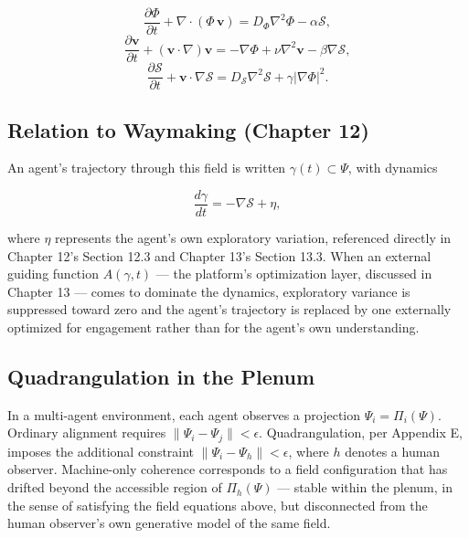 \documentclass[12pt,a4paper]{book}
\begin{document}
\[
\frac{\partial \Phi}{\partial t} + \nabla \cdot (\Phi\, \mathbf{v}) = D_\Phi \nabla^2 \Phi - \alpha \mathcal{S},
\]
\[
\frac{\partial \mathbf{v}}{\partial t} + (\mathbf{v} \cdot \nabla)\mathbf{v} = -\nabla \Phi + \nu \nabla^2 \mathbf{v} - \beta \nabla \mathcal{S},
\]
\[
\frac{\partial \mathcal{S}}{\partial t} + \mathbf{v} \cdot \nabla \mathcal{S} = D_\mathcal{S} \nabla^2 \mathcal{S} + \gamma |\nabla \Phi|^2.
\]

\subsection*{Relation to Waymaking (Chapter 12)}

An agent's trajectory through this field is written $\gamma(t) \subset \Psi$, with dynamics

\[
\frac{d\gamma}{dt} = -\nabla \mathcal{S} + \eta,
\]

where $\eta$ represents the agent's own exploratory variation, referenced directly in Chapter 12's Section 12.3 and Chapter 13's Section 13.3. When an external guiding function $A(\gamma, t)$ — the platform's optimization layer, discussed in Chapter 13 — comes to dominate the dynamics, exploratory variance is suppressed toward zero and the agent's trajectory is replaced by one externally optimized for engagement rather than for the agent's own understanding.

\subsection*{Quadrangulation in the Plenum}

In a multi-agent environment, each agent observes a projection $\Psi_i = \Pi_i(\Psi)$. Ordinary alignment requires $\|\Psi_i - \Psi_j\| < \epsilon$. Quadrangulation, per Appendix E, imposes the additional constraint $\|\Psi_i - \Psi_h\| < \epsilon$, where $h$ denotes a human observer. Machine-only coherence corresponds to a field configuration that has drifted beyond the accessible region of $\Pi_h(\Psi)$ — stable within the plenum, in the sense of satisfying the field equations above, but disconnected from the human observer's own generative model of the same field.
\end{document}
